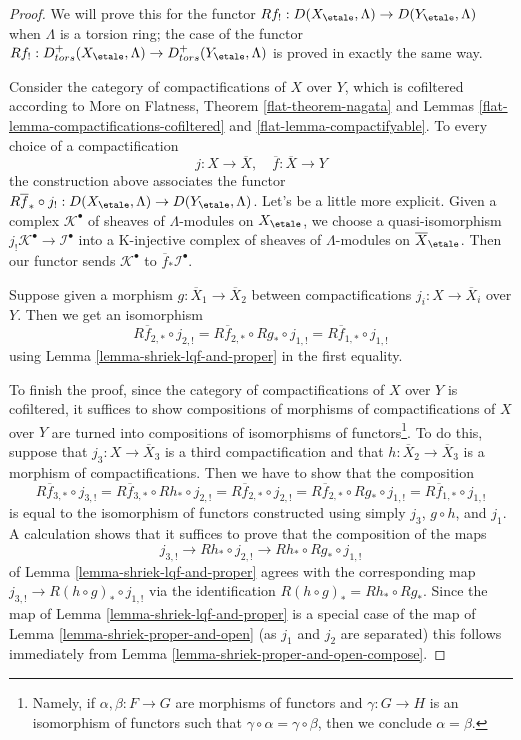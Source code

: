 \begin{proof}
We will prove this for the functor
$Rf_! : D(X_\etale, \Lambda) \to D(Y_\etale, \Lambda)$
when $\Lambda$ is a torsion ring; the case of the functor
$Rf_! : D^+_{tors}(X_\etale, \Lambda) \to D^+_{tors}(Y_\etale, \Lambda)$
is proved in exactly the same way.

\medskip\noindent
Consider the category of compactifications of $X$ over $Y$, which is
cofiltered according to More on Flatness, Theorem \ref{flat-theorem-nagata} and
Lemmas \ref{flat-lemma-compactifications-cofiltered} and
\ref{flat-lemma-compactifyable}.
To every choice of a compactification
$$
j : X \to \overline{X},\quad \overline{f} : \overline{X} \to Y
$$
the construction above associates the functor $R\overline{f}_* \circ j_! :
D(X_\etale, \Lambda) \to D(Y_\etale, \Lambda)$.
Let's be a little more explicit. Given a complex $\mathcal{K}^\bullet$
of sheaves of $\Lambda$-modules on $X_\etale$, we choose a quasi-isomorphism
$j_!\mathcal{K}^\bullet \to \mathcal{I}^\bullet$ into a K-injective
complex of sheaves of $\Lambda$-modules on $\overline{X}_\etale$.
Then our functor sends $\mathcal{K}^\bullet$ to
$\overline{f}_*\mathcal{I}^\bullet$.

\medskip\noindent
Suppose given a morphism $g : \overline{X}_1 \to \overline{X}_2$
between compactifications $j_i : X \to \overline{X}_i$ over $Y$.
Then we get an isomorphism
$$
R\overline{f}_{2, *} \circ j_{2, !} =
R\overline{f}_{2, *} \circ Rg_* \circ j_{1, !} =
R\overline{f}_{1, *} \circ j_{1, !}
$$
using Lemma \ref{lemma-shriek-lqf-and-proper} in the first equality.

\medskip\noindent
To finish the proof, since the category of compactifications of $X$ over $Y$
is cofiltered, it suffices to show compositions of morphisms of
compactifications of $X$ over $Y$ are turned into compositions of
isomorphisms of functors\footnote{Namely, if $\alpha, \beta : F \to G$
are morphisms of functors and $\gamma : G \to H$ is an isomorphism
of functors such that $\gamma \circ \alpha = \gamma \circ \beta$, then
we conclude $\alpha = \beta$.}. To do this, suppose that
$j_3 : X \to \overline{X}_3$
is a third compactification and that $h : \overline{X}_2 \to \overline{X}_3$
is a morphism of compactifications. Then we have to show that the
composition
$$
R\overline{f}_{3, *} \circ j_{3, !} =
R\overline{f}_{3, *} \circ Rh_* \circ j_{2, !} =
R\overline{f}_{2, *} \circ j_{2, !} =
R\overline{f}_{2, *} \circ Rg_* \circ j_{1, !} =
R\overline{f}_{1, *} \circ j_{1, !}
$$
is equal to the isomorphism of functors constructed using simply
$j_3$, $g \circ h$, and $j_1$. A calculation shows that it suffices to
prove that the composition of the maps
$$
j_{3, !} \to Rh_* \circ j_{2, !} \to Rh_* \circ Rg_* \circ j_{1, !}
$$
of Lemma \ref{lemma-shriek-lqf-and-proper} agrees with the corresponding
map $j_{3, !} \to R(h \circ g)_* \circ j_{1, !}$
via the identification $R(h \circ g)_* = Rh_* \circ Rg_*$.
Since the map of Lemma \ref{lemma-shriek-lqf-and-proper}
is a special case of the map of Lemma \ref{lemma-shriek-proper-and-open}
(as $j_1$ and $j_2$ are separated) this follows immediately from
Lemma \ref{lemma-shriek-proper-and-open-compose}.
\end{proof}

